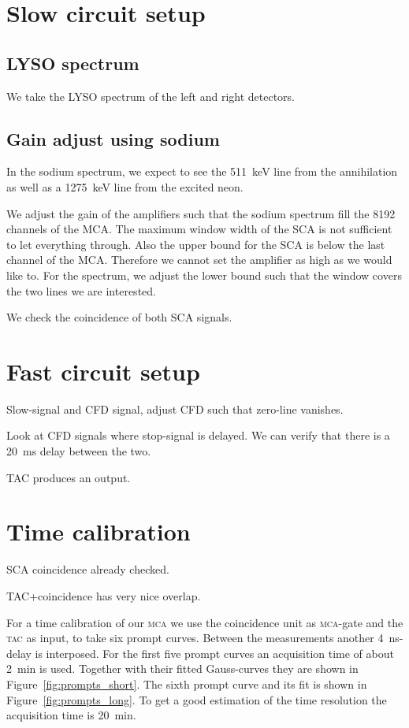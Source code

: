 \documentclass[11pt, english, fleqn, DIV=15, headinclude, BCOR=2cm]{scrreprt}
\begin{document}
\section{Slow circuit setup}

\subsection{LYSO spectrum}

We take the LYSO spectrum of the left and right detectors.

\subsection{Gain adjust using sodium}

In the sodium spectrum, we expect to see the \SI{511}{\kilo\electronvolt} line
from the annihilation as well as a \SI{1275}{\kilo\electronvolt} line from the
excited neon.

We adjust the gain of the amplifiers such that the sodium spectrum fill the
8192 channels of the MCA\@. The maximum window width of the SCA is not
sufficient to let everything through. Also the upper bound for the SCA is below
the last channel of the MCA\@. Therefore we cannot set the amplifier as high as
we would like to. For the spectrum, we adjust the lower bound such that the
window covers the two lines we are interested.

We check the coincidence of both SCA signals.

\section{Fast circuit setup}

Slow-signal and CFD signal, adjust CFD such that zero-line vanishes.

Look at CFD signals where stop-signal is delayed. We can verify that there is a
\SI{20}{\milli\second} delay between the two.

TAC produces an output.

\section{Time calibration}

SCA coincidence already checked.

TAC+coincidence has very nice overlap.

For a time calibration of our \textsc{mca} we use the coincidence unit as
\textsc{mca}-gate and the \textsc{tac} as input, to take six prompt curves.
Between the measurements another \SI{4}{\nano\second}-delay is interposed. For
the first five prompt curves an acquisition time of about \SI{2}{\minute} is
used.  Together with their fitted Gauss-curves they are shown in
Figure~\ref{fig:prompts_short}. The sixth prompt curve and its fit is shown in
Figure~\ref{fig:prompts_long}. To get a good estimation of the time resolution
the acquisition time is \SI{20}{\minute}.
\end{document}
